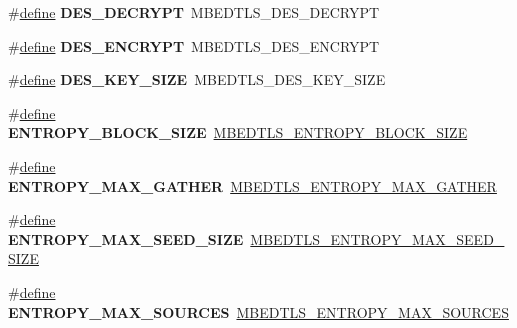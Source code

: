 \begin{DoxyCompactItemize}
\#\hyperlink{structdefine}{define} {\bfseries D\+E\+S\+\_\+\+D\+E\+C\+R\+Y\+PT}~M\+B\+E\+D\+T\+L\+S\+\_\+\+D\+E\+S\+\_\+\+D\+E\+C\+R\+Y\+PT
\item 
\mbox{\label{compat-1_83_8h_a89730e026cc6082480f070985e91e8aa}} 
\#\hyperlink{structdefine}{define} {\bfseries D\+E\+S\+\_\+\+E\+N\+C\+R\+Y\+PT}~M\+B\+E\+D\+T\+L\+S\+\_\+\+D\+E\+S\+\_\+\+E\+N\+C\+R\+Y\+PT
\item 
\mbox{\label{compat-1_83_8h_a8bf6267292365ce38e20d505445a361b}} 
\#\hyperlink{structdefine}{define} {\bfseries D\+E\+S\+\_\+\+K\+E\+Y\+\_\+\+S\+I\+ZE}~M\+B\+E\+D\+T\+L\+S\+\_\+\+D\+E\+S\+\_\+\+K\+E\+Y\+\_\+\+S\+I\+ZE
\item 
\mbox{\label{compat-1_83_8h_a4610ce6582323b8906b9e05ae6253dfb}} 
\#\hyperlink{structdefine}{define} {\bfseries E\+N\+T\+R\+O\+P\+Y\+\_\+\+B\+L\+O\+C\+K\+\_\+\+S\+I\+ZE}~\hyperlink{entropy_8h_acc0fdb8c34a1ae04a81b4b21cb383941}{M\+B\+E\+D\+T\+L\+S\+\_\+\+E\+N\+T\+R\+O\+P\+Y\+\_\+\+B\+L\+O\+C\+K\+\_\+\+S\+I\+ZE}
\item 
\mbox{\label{compat-1_83_8h_acc7f201066c056a514433c5a6224b720}} 
\#\hyperlink{structdefine}{define} {\bfseries E\+N\+T\+R\+O\+P\+Y\+\_\+\+M\+A\+X\+\_\+\+G\+A\+T\+H\+ER}~\hyperlink{entropy_8h_a21637aa9a738da4fce13931a8442dc28}{M\+B\+E\+D\+T\+L\+S\+\_\+\+E\+N\+T\+R\+O\+P\+Y\+\_\+\+M\+A\+X\+\_\+\+G\+A\+T\+H\+ER}
\item 
\mbox{\label{compat-1_83_8h_a23cd05df3838590ba3b1688290c9c1fa}} 
\#\hyperlink{structdefine}{define} {\bfseries E\+N\+T\+R\+O\+P\+Y\+\_\+\+M\+A\+X\+\_\+\+S\+E\+E\+D\+\_\+\+S\+I\+ZE}~\hyperlink{entropy_8h_afff6ba3d7fc6df1fedd007d3a9a4136b}{M\+B\+E\+D\+T\+L\+S\+\_\+\+E\+N\+T\+R\+O\+P\+Y\+\_\+\+M\+A\+X\+\_\+\+S\+E\+E\+D\+\_\+\+S\+I\+ZE}
\item 
\mbox{\label{compat-1_83_8h_a5e9ba2c083acc78efc758deca62d162d}} 
\#\hyperlink{structdefine}{define} {\bfseries E\+N\+T\+R\+O\+P\+Y\+\_\+\+M\+A\+X\+\_\+\+S\+O\+U\+R\+C\+ES}~\hyperlink{entropy_8h_a819aa4f3046aa257738f0dafe481ca1f}{M\+B\+E\+D\+T\+L\+S\+\_\+\+E\+N\+T\+R\+O\+P\+Y\+\_\+\+M\+A\+X\+\_\+\+S\+O\+U\+R\+C\+ES}
\item 
\mbox{\label{compat-1_83_8h_a790c9f23655a9bbe05053276e91ad093}} 

\end{DoxyCompactItemize}
